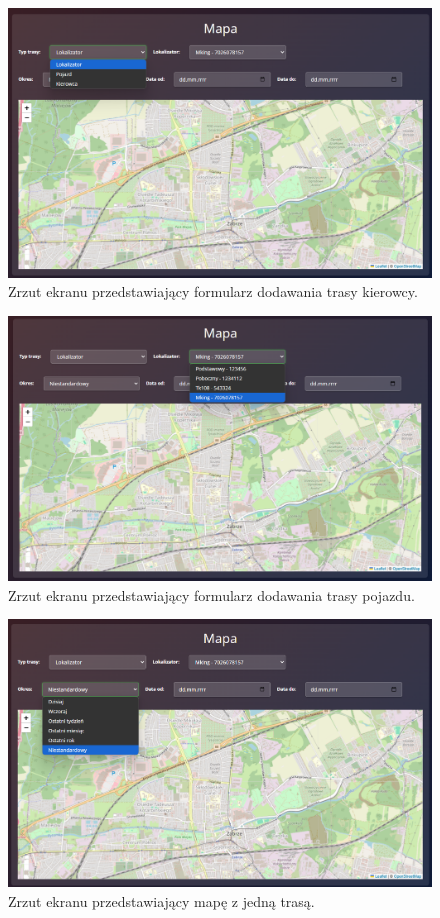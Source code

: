 \begin{figure}
	\centering
	\includegraphics[width=1\textwidth]{./graf/map_type.png}
	\caption{Zrzut ekranu przedstawiający formularz dodawania trasy kierowcy.}
	\label{fig:map_type}
\end{figure}

\begin{figure}
	\centering
	\includegraphics[width=1\textwidth]{./graf/map_tracker.png}
	\caption{Zrzut ekranu przedstawiający formularz dodawania trasy pojazdu.}
	\label{fig:/map_tracker}
\end{figure}

\begin{figure}
	\centering
	\includegraphics[width=1\textwidth]{./graf/map_period.png}
	\caption{Zrzut ekranu przedstawiający mapę z jedną trasą.}
	\label{fig:map_period}
\end{figure}

